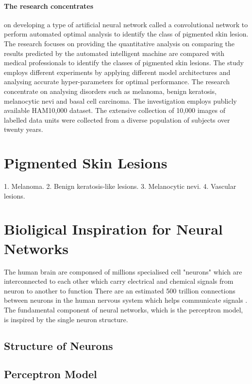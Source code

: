 \paragraph{ The research concentrates}
on developing a type of artificial neural network called a convolutional network to perform automated optimal analysis to identify the class of pigmented skin lesion. 
The research focuses on providing the quantitative analysis on comparing the results predicted by the automated intelligent machine are compared with medical professionals to identify the classes of pigmented skin lesions. The study employs different experiments by applying different model architectures and analysing accurate hyper-parameters for optimal performance. 
The research concentrate on analysing disorders such as melanoma, benign keratosis, melanocytic nevi and basal cell carcinoma. The investigation employs publicly available HAM10,000 dataset. 
The extensive collection of 10,000 images of labelled data units were collected from a diverse population of subjects over twenty years.


\section{Pigmented Skin Lesions}
1. Melanoma. 
2. Benign keratosis-like lesions.
3. Melanocytic nevi. 
4. Vascular lesions.
\pagebreak
\pagebreak
\section{Bioligical Inspiration for Neural Networks}
The human brain are componsed of millions specialised cell "neurons" which are interconnected to each other which carry electrical and chemical signals from neuron to another to function
There are an estimated 500 trillion connections between neurons in the human nervous system which helps communicate signals \citep*{patterson2017deep}.
The fundamental component of neural networks, which is the perceptron model, is inspired by the single neuron structure.
\subsection{Structure of Neurons}

\subsection{Perceptron Model}
\pagebreak
